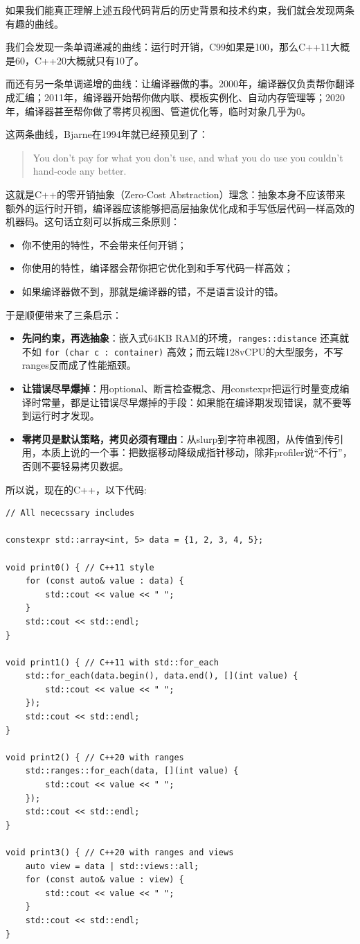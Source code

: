 如果我们能真正理解上述五段代码背后的历史背景和技术约束，我们就会发现两条有趣的曲线。

我们会发现一条单调递减的曲线：运行时开销，C99如果是100，那么C++11大概是60，C++20大概就只有10了。

而还有另一条单调递增的曲线：让编译器做的事。2000年，编译器仅负责帮你翻译成汇编；2011年，编译器开始帮你做内联、模板实例化、自动内存管理等；2020年，编译器甚至帮你做了零拷贝视图、管道优化等，临时对象几乎为0。

这两条曲线，Bjarne在1994年就已经预见到了：
\begin{quote}
    You don’t pay for what you don’t use, and what you do use you couldn’t hand-code any better.
\end{quote}
这就是C++的零开销抽象（Zero-Cost Abstraction）理念：抽象本身不应该带来额外的运行时开销，编译器应该能够把高层抽象优化成和手写低层代码一样高效的机器码。这句话立刻可以拆成三条原则：
\begin{itemize}
  \item 你不使用的特性，不会带来任何开销；
  \item 你使用的特性，编译器会帮你把它优化到和手写代码一样高效；
  \item 如果编译器做不到，那就是编译器的错，不是语言设计的错。
\end{itemize}
于是顺便带来了三条启示：
\begin{itemize}
  \item \textbf{先问约束，再选抽象}：嵌入式64KB RAM的环境，\texttt{ranges::distance} 还真就不如 \texttt{for (char c : container)} 高效；而云端128vCPU的大型服务，不写ranges反而成了性能瓶颈。
  \item \textbf{让错误尽早爆掉}：用optional、断言检查概念、用constexpr把运行时量变成编译时常量，都是让错误尽早爆掉的手段：如果能在编译期发现错误，就不要等到运行时才发现。
  \item \textbf{零拷贝是默认策略，拷贝必须有理由}：从slurp到字符串视图，从传值到传引用，本质上说的一个事：把数据移动降级成指针移动，除非profiler说“不行”，否则不要轻易拷贝数据。
\end{itemize}

所以说，现在的C++，以下代码:

\begin{verbatim}
// All nececssary includes

constexpr std::array<int, 5> data = {1, 2, 3, 4, 5};

void print0() { // C++11 style
    for (const auto& value : data) {
        std::cout << value << " ";
    }
    std::cout << std::endl;
}

void print1() { // C++11 with std::for_each
    std::for_each(data.begin(), data.end(), [](int value) {
        std::cout << value << " ";
    });
    std::cout << std::endl;
}

void print2() { // C++20 with ranges
    std::ranges::for_each(data, [](int value) {
        std::cout << value << " ";
    });
    std::cout << std::endl;
}

void print3() { // C++20 with ranges and views
    auto view = data | std::views::all;
    for (const auto& value : view) {
        std::cout << value << " ";
    }
    std::cout << std::endl;
}
\end{verbatim}

